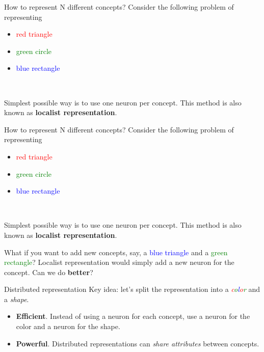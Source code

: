 \begin{frame}{How to represent N different concepts?}
Consider the following problem of representing 
\begin{itemize} 
  \item \textcolor{red}{red triangle} 
  \item \textcolor{green}{green circle} 
  \item \textcolor{blue}{blue rectangle}
\end{itemize} ~\newline

Simplest possible way is to use one neuron per concept. This method is also known as \textbf{localist representation}. \newline
\end{frame}

\begin{frame}{How to represent N different concepts?}
Consider the following problem of representing 
\begin{itemize} 
  \item \textcolor{red}{red triangle} 
  \item \textcolor{green}{green circle} 
  \item \textcolor{blue}{blue rectangle}
\end{itemize} ~\newline

Simplest possible way is to use one neuron per concept. This method is also known as \textbf{localist representation}. \newline

What if you want to add new concepts, say, a \textcolor{blue}{blue triangle} and a \textcolor{green}{green rectangle}? Localist representation would simply add a new neuron for the concept. Can we do \textbf{better}?
\end{frame}

\begin{frame}{Distributed representation}
Key idea: let's split the representation into a \textit{\textcolor{red}{c}\textcolor{green}{o}\textcolor{blue}{l}\textcolor{red}{o}\textcolor{green}{r}} and a \textit{shape}. \newline

\begin{itemize}
	\item \textbf{Efficient}. Instead of using a neuron for each concept, use a neuron for the color and a neuron for the shape. 
	\item \textbf{Powerful}. Distributed representations can \textit{share attributes} between concepts. 
\end{itemize}
\end{frame}

